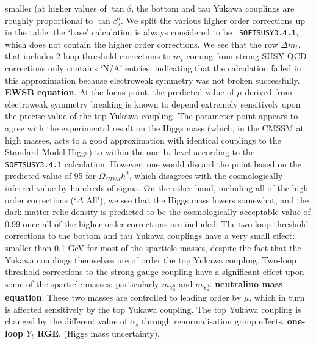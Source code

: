 \documentclass[final,3p,times,pdflatex]{elsarticle}
\begin{document}
smaller (at higher values of $\tan \beta$, the bottom and tau Yukawa couplings
are roughly proportional to $\tan \beta$).
We split the various higher order corrections up in
the table: the `base' calculation is always considered to be {\tt
  SOFTSUSY3.4.1}, which does not contain the higher order corrections. 
We see that the row $\Delta m_t$, that includes 2-loop threshold corrections
to $m_t$ coming from strong SUSY QCD corrections only contains `N/A' entries,
indicating that the calculation failed in this approximation because
electroweak symmetry was not broken successfully. {\bf EWSB equation}.
At the focus point,
the predicted value of $\mu$ derived from electroweak symmetry breaking is
known to 
depend extremely sensitively upon the precise value of the top Yukawa
coupling. 
The parameter point appears to agree with the experimental result on the Higgs
mass (which, in the CMSSM at high masses, acts to a good approximation with
identical couplings to the Standard Model Higgs)
to within the one 1$\sigma$ level according to the {\tt SOFTSUSY3.4.1}
calculation. However, one would discard the point based on the predicted value
of 95 for $\Omega_{CDM} h^2$, which disagrees with the cosmologically inferred
value by hundreds of sigma. On the other hand, including all of the high order
corrections (`$\Delta$ All'), we see that the Higgs mass lowers somewhat, and
the dark matter 
relic density is predicted to be the cosmologically acceptable value of 0.99
once all of the higher order corrections are included.
The two-loop threshold corrections to the bottom and tau Yukawa couplings 
have a very small effect: smaller than 0.1 GeV for most of the sparticle
masses, despite the fact that the Yukawa couplings themselves are of order the
top Yukawa coupling. 
Two-loop threshold corrections to the strong gauge coupling have a significant
effect upon some of the sparticle masses: particularly $m_{\chi_3^0}$ and
$m_{\chi_4^0}$. {\bf neutralino mass equation}.
These two masses are controlled to leading order by $\mu$,
which in turn is affected sensitively by the top Yukawa coupling. 
The top Yukawa coupling is changed by the different value of $\alpha_s$
through renormalisation group effects. {\bf one-loop $Y_t$ RGE}.
(Higgs mass uncertainty).
\end{document}
